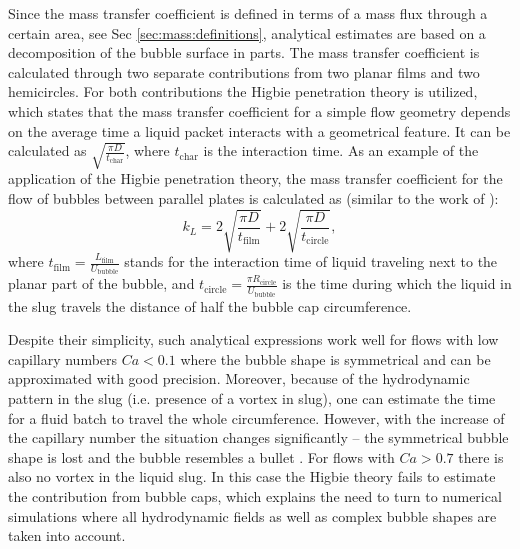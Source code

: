 \documentclass[review,12pt]{elsarticle}
\newcommand{\beq}{\begin{equation}}
\newcommand{\feq}{\end{equation}}
\newcommand{\lfilm}{L_{\mathrm{film}}}
\newcommand{\ububble}{U_{\mathrm{bubble}}}
\begin{document}
Since the mass transfer coefficient is defined in terms of a mass flux through a certain area, see Sec \ref{sec:mass:definitions},
analytical estimates \cite{kreutzer-overview,irandoust} are based on a decomposition of the bubble surface in parts. The mass
 transfer coefficient is calculated through two separate contributions from two planar films and two hemicircles. For both 
contributions the Higbie penetration theory \cite{higbie} is utilized, which states that the mass transfer coefficient
 for a simple flow geometry depends on the average time a liquid packet interacts with a geometrical feature. It 
can be calculated as $\sqrt{\frac{\pi D}{t_{\mathrm{char}}}}$, where $t_{\mathrm{char}}$ is the interaction 
time. As an example of the application of the Higbie penetration theory,
 the mass  transfer coefficient 
for the flow of bubbles between parallel plates  is calculated as (similar to the work of \citet{vanbaten-circular}):
\beq
k_L=2 \sqrt{\frac{\pi D}{t_{\mathrm{film}}}}+2 \sqrt{\frac{\pi D}{t_{\mathrm{circle}}}},
\feq
where $t_{\mathrm{film}}=\frac{\lfilm}{\ububble}$ stands for the interaction time of liquid traveling next to the planar part
 of the bubble, and $t_{\mathrm{circle}}=\frac{\pi R_{\mathrm{circle}}}{\ububble}$ is the time during which the liquid in the slug travels the distance of half the bubble cap circumference. 

Despite their simplicity, such analytical expressions work well for flows with low
capillary numbers $Ca<0.1$ \cite{bercic-mass} where the bubble shape is
symmetrical and can be approximated with good precision. Moreover, because of the
hydrodynamic pattern in the slug (i.e. presence of a vortex in slug), one can
estimate the time for a fluid batch to travel the whole circumference.   However,
with the increase of the capillary number the situation changes significantly -- the
symmetrical bubble shape is lost and the bubble resembles a bullet \cite{kuzmin-binary2d}.
For flows with $Ca>0.7$ there is also no vortex in the liquid slug. In this case the Higbie theory fails
to estimate the contribution from bubble caps, which explains the need to turn to numerical simulations where all
hydrodynamic fields as well as complex bubble shapes are taken into account.
\end{document}
